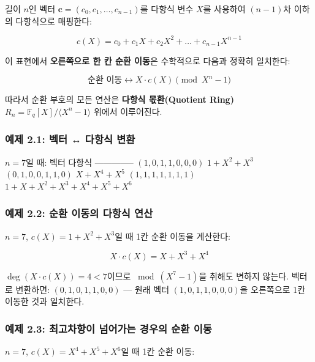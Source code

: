 \documentclass[
  oneside]{article}
\begin{document}
길이 \(n\)인 벡터 \(\mathbf{c} = (c_0, c_1, \dots, c_{n-1})\)를 다항식
변수 \(X\)를 사용하여 \((n-1)\)차 이하의 다항식으로 매핑한다:

\[c(X) = c_0 + c_1 X + c_2 X^2 + \dots + c_{n-1} X^{n-1}\]

이 표현에서 \textbf{오른쪽으로 한 칸 순환 이동}은 수학적으로 다음과
정확히 일치한다:

\[\text{순환 이동} \longleftrightarrow X \cdot c(X) \pmod{X^n - 1}\]

따라서 순환 부호의 모든 연산은 \textbf{다항식 몫환(Quotient Ring)}
\(R_n = \mathbb{F}_q[X]/ \langle X^n - 1 \rangle\) 위에서 이루어진다.

\subsubsection{예제 2.1: 벡터 ↔ 다항식
변환}\label{uxc608uxc81c-2.1-uxbca1uxd130-uxb2e4uxd56duxc2dd-uxbcc0uxd658}

\(n = 7\)일 때: \textbar{} 벡터 \textbar{} 다항식 \textbar{}
\textbar------\textbar--------\textbar{} \textbar{}
\((1, 0, 1, 1, 0, 0, 0)\) \textbar{} \(1 + X^2 + X^3\) \textbar{}
\textbar{} \((0, 1, 0, 0, 1, 1, 0)\) \textbar{} \(X + X^4 + X^5\)
\textbar{} \textbar{} \((1, 1, 1, 1, 1, 1, 1)\) \textbar{}
\(1 + X + X^2 + X^3 + X^4 + X^5 + X^6\) \textbar{}

\subsubsection{예제 2.2: 순환 이동의 다항식
연산}\label{uxc608uxc81c-2.2-uxc21cuxd658-uxc774uxb3d9uxc758-uxb2e4uxd56duxc2dd-uxc5f0uxc0b0}

\(n = 7\), \(c(X) = 1 + X^2 + X^3\)일 때 1칸 순환 이동을 계산한다:

\[X \cdot c(X) = X + X^3 + X^4\]

\(\deg(X \cdot c(X)) = 4 < 7\)이므로 \(\bmod (X^7 - 1)\)을 취해도 변하지
않는다. 벡터로 변환하면: \((0, 1, 0, 1, 1, 0, 0)\) --- 원래 벡터
\((1, 0, 1, 1, 0, 0, 0)\)을 오른쪽으로 1칸 이동한 것과 일치한다.

\subsubsection{예제 2.3: 최고차항이 넘어가는 경우의 순환
이동}\label{uxc608uxc81c-2.3-uxcd5cuxace0uxcc28uxd56duxc774-uxb118uxc5b4uxac00uxb294-uxacbduxc6b0uxc758-uxc21cuxd658-uxc774uxb3d9}

\(n = 7\), \(c(X) = X^4 + X^5 + X^6\)일 때 1칸 순환 이동:
\end{document}
